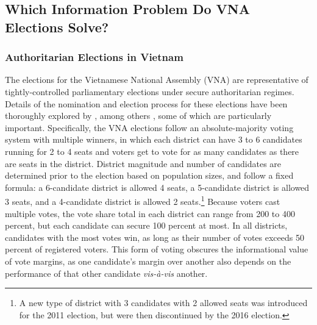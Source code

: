 \documentclass[12pt]{article}
\newcommand{\1}{\mathbbm{1}}
\begin{document}
\subsection{Which Information Problem Do VNA Elections Solve?}
\label{sec:vietnam_solutions}

\subsubsection{Authoritarian Elections in Vietnam}
\label{sec:vietnam_elections}

The elections for the Vietnamese National Assembly (VNA) are representative of tightly-controlled parliamentary elections under secure authoritarian regimes. Details of the nomination and election process for these elections have been thoroughly explored by \cite{MaleskySchuler2011}, among others \citep[e.g][]{Gainsborough2005}, some of which are particularly important. Specifically, the VNA elections follow an absolute-majority voting system with multiple winners, in which each district can have 3 to 6 candidates running for 2 to 4 seats and voters get to vote for as many candidates as there are seats in the district. District magnitude and number of candidates are determined prior to the election based on population sizes, and follow a fixed formula: a 6-candidate district is allowed 4 seats, a 5-candidate district is allowed 3 seats, and a 4-candidate district is allowed 2 seats.\footnote{A new type of district with 3 candidates with 2 allowed seats was introduced for the 2011 election, but were then discontinued by the 2016 election.} Because voters cast multiple votes, the vote share total in each district can range from 200 to 400 percent, but each candidate can secure 100 percent at most. In all districts, candidates with the most votes win, as long as their number of votes exceeds 50 percent of registered voters. This form of voting obscures the informational value of vote margins, as one candidate's margin over another also depends on the performance of that other candidate \textit{vis-\`{a}-vis} another.
\end{document}
